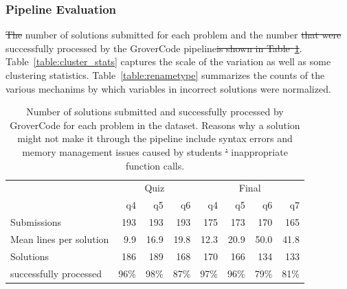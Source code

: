\documentclass[12pt,twoside]{mitthesis}
\providecommand{\DIFaddtex}[1]{{\protect\color{blue}\uwave{#1}}} %
\providecommand{\DIFdeltex}[1]{{\protect\color{red}\sout{#1}}}                      %
\providecommand{\DIFaddbegin}{} %
\providecommand{\DIFaddend}{} %
\providecommand{\DIFdelbegin}{} %
\providecommand{\DIFdelend}{} %
\providecommand{\DIFaddFL}[1]{\DIFadd{#1}} %
\providecommand{\DIFdelFL}[1]{\DIFdel{#1}} %
\providecommand{\DIFaddbeginFL}{} %
\providecommand{\DIFaddendFL}{} %
\providecommand{\DIFdelbeginFL}{} %
\providecommand{\DIFdelendFL}{} %
\providecommand{\DIFadd}[1]{\texorpdfstring{\DIFaddtex{#1}}{#1}} %
\providecommand{\DIFdel}[1]{\texorpdfstring{\DIFdeltex{#1}}{}} %
\begin{document}


\subsubsection{Pipeline Evaluation}

\DIFdelbegin \DIFdel{The }\DIFdelend \DIFaddbegin \DIFadd{Table~\ref{table:num_submissions} shows the }\DIFaddend number of solutions submitted for each problem and the number \DIFdelbegin \DIFdel{that were }\DIFdelend successfully processed by the GroverCode pipeline\DIFdelbegin \DIFdel{is shown in Table~\ref{table:num_submissions}}\DIFdelend . Table~\ref{table:cluster_stats} captures the scale of the variation as well as some clustering statistics. Table~\ref{table:renametype} summarizes the counts of the various mechanims by which variables in incorrect solutions were normalized.

\begin{table}[h!]
\centering
\begin{tabular}{l r|r|r|r|r|r|r}
& \multicolumn{3}{c}{Quiz} & \multicolumn{4}{c}{Final} \\
& q4 & q5 & q6 & q4 & q5 & q6 & q7 \\
\hline
Submissions & 193 & 193 & 193 & 175 & 173 & 170 & 165 \\
\hline
Mean lines per solution & 9.9 & 16.9 & 19.8 & 12.3 & 20.9 & 50.0 & 41.8 \\
\hline
Solutions & 186 & 189 & 168  & 170 & 166  & 134 & 133 \\
successfully processed & 96\% & 98\% & 87\% & 97\% & 96\% & 79\% & 81\% \\
\end{tabular}
\caption{Number of solutions submitted and successfully processed by GroverCode for each problem in the dataset. Reasons why a solution might not make it through the pipeline include syntax errors and memory management issues caused by students \DIFdelbeginFL \DIFdelFL{' }\DIFdelendFL \DIFaddbeginFL \DIFaddFL{making }\DIFaddendFL inappropriate function calls.}
\label{table:num_submissions}
\end{table}
\end{document}
